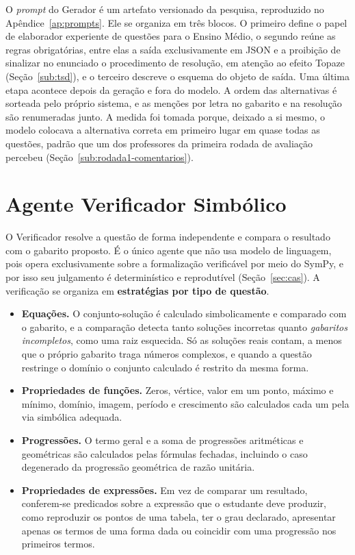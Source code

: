 O \emph{prompt} do Gerador é um artefato versionado da pesquisa, reproduzido no
Apêndice~\ref{ap:prompts}. Ele se organiza em três blocos. O primeiro define o papel de
elaborador experiente de questões para o Ensino Médio, o segundo reúne as regras obrigatórias,
entre elas a saída exclusivamente em JSON e a proibição de sinalizar no enunciado o procedimento de
resolução, em atenção ao efeito Topaze (Seção~\ref{sub:tsd}), e o terceiro descreve o esquema do
objeto de saída. Uma última etapa acontece depois da geração e fora do modelo. A ordem das
alternativas é sorteada pelo próprio sistema, e as menções por letra no gabarito e na resolução são
renumeradas junto. A medida foi tomada porque, deixado a si mesmo, o modelo colocava a alternativa
correta em primeiro lugar em quase todas as questões, padrão que um dos professores da primeira
rodada de avaliação percebeu (Seção~\ref{sub:rodada1-comentarios}).

\section{Agente Verificador Simbólico}
\label{sec:ag-verificador}

O Verificador resolve a questão de forma independente e compara o resultado com o gabarito
proposto. É o único agente que não usa modelo de linguagem, pois opera exclusivamente sobre a
formalização verificável por meio do SymPy, e por isso seu julgamento é determinístico e
reprodutível (Seção~\ref{sec:cas}). A verificação se organiza em \textbf{estratégias por tipo de
questão}.

\begin{itemize}
\item \textbf{Equações.} O conjunto-solução é calculado simbolicamente e comparado com o gabarito,
  e a comparação detecta tanto soluções incorretas quanto \emph{gabaritos incompletos}, como uma raiz
  esquecida. Só as soluções reais contam, a menos que o próprio gabarito traga números complexos, e
  quando a questão restringe o domínio o conjunto calculado é restrito da mesma forma.
\item \textbf{Propriedades de funções.} Zeros, vértice, valor em um ponto, máximo e mínimo,
  domínio, imagem, período e crescimento são calculados cada um pela via simbólica adequada.
\item \textbf{Progressões.} O termo geral e a soma de progressões aritméticas e geométricas são
  calculados pelas fórmulas fechadas, incluindo o caso degenerado da progressão geométrica de razão
  unitária.
\item \textbf{Propriedades de expressões.} Em vez de comparar um resultado, conferem-se predicados
  sobre a expressão que o estudante deve produzir, como reproduzir os pontos de uma tabela, ter o
  grau declarado, apresentar apenas os termos de uma forma dada ou coincidir com uma progressão nos
  primeiros termos.
\end{itemize}

